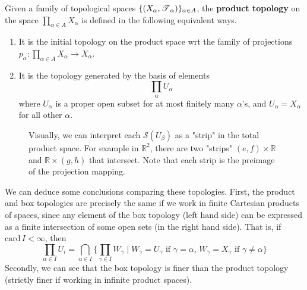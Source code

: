   \begin{definition} 
    Given a family of topological spaces $\{(X_\alpha, \operatorname{\mathscr{T}}_\alpha)\}_{\alpha \in A}$, the \textbf{product topology} on the space $\prod_{\alpha \in A} X_\alpha$ is defined in the following equivalent ways. 
    \begin{enumerate}
      \item It is the initial topology on the product space wrt the family of projections $p_\alpha: \prod_{\alpha \in A} X_\alpha \rightarrow X_\alpha$. 

      \item It is the topology generated by the basis of elements 
      \begin{equation}
        \prod_\alpha U_\alpha 
      \end{equation}
      where $U_\alpha$ is a proper open subset for at most finitely many $\alpha$'s, and $U_\alpha = X_\alpha$ for all other $\alpha$. 
    \end{enumerate}

    \begin{figure}[H]
      \centering 
      \caption{Visually, we can interpret each $\mathscr{S} (U_\beta)$ as a "strip" in the total product space. For example in $\mathbb{R}^2$, there are two "strips" $(e, f) \times \mathbb{R}$ and $\mathbb{R} \times (g, h)$ that intersect. Note that each strip is the preimage of the projection mapping. }
      \label{fig:product_topology}
    \end{figure}
  \end{definition}

  We can deduce some conclusions comparing these topologies. First, the product and box topologies are precisely the same if we work in finite Cartesian products of spaces, since any element of the box topology (left hand side) can be expressed as a finite intersection of some open sets (in the right hand side). That is, if $\text{card}\,I < \infty$, then 
  \begin{equation}
    \prod_{\alpha \in I} U_i = \bigcap_{\alpha \in I} \big\{ \prod_{\gamma \in I} W_\gamma \; | \; W_\gamma = U_\gamma \text{ if } \gamma = \alpha, \, W_\gamma = X_\gamma \text{ if } \gamma \neq \alpha\big\}
  \end{equation}
  Secondly, we can see that the box topology is finer than the product topology (strictly finer if working in infinite product spaces). 

